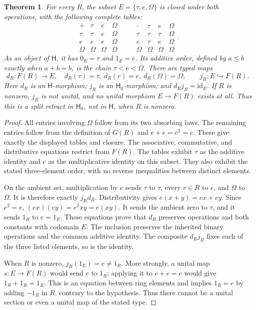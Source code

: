 \documentclass[11pt]{article}
\newtheorem{theorem}{Theorem}[section]
\theoremstyle{definition}
\newcommand{\HH}{\mathsf H}
\newcommand{\HHZ}{\mathsf H_0}
\newcommand{\Om}{\Omega}
\begin{document}
\begin{theorem}\label{thm:tripleretract}
For every \(R\), the subset \(E=\{\tau,e,\Om\}\) is closed under
both operations, with the following complete tables:
\[
\begin{array}{c|ccc}
 +&\tau&e&\Om\\\hline
 \tau&\tau&e&\Om\\
 e&e&e&\Om\\
 \Om&\Om&\Om&\Om
\end{array}
\qquad
\begin{array}{c|ccc}
 \cdot&\tau&e&\Om\\\hline
 \tau&\tau&\tau&\Om\\
 e&\tau&e&\Om\\
 \Om&\Om&\Om&\Om
\end{array}.
\tag{14}\label{eq:Etable}
\]
As an object of \(\HH\), it has \(0_E=\tau\) and \(1_E=e\).
Its additive order, defined by \(a\le b\) exactly when \(a+b=b\),
is the chain \(\tau<e<\Om\). There are typed maps
\[
 d_R:F(R)\longrightarrow E,\quad
 d_R(\tau)=\tau,\ d_R(r)=e,\ d_R(\Om)=\Om,
 \qquad j_R:E\hookrightarrow F(R).
\tag{15}\label{eq:dretract}
\]
Here \(d_R\) is an \(\HH\)-morphism; \(j_R\) is an
\(\HHZ\)-morphism; and \(d_Rj_R=\mathrm{id}_E\).
If \(R\) is nonzero, \(j_R\) is not unital, and no unital morphism
\(E\to F(R)\) exists at all. Thus this is a split retract in
\(\HHZ\), not in \(\HH\), when \(R\) is nonzero.
\end{theorem}
\begin{proof}
All entries involving \(\Om\) follow from its two absorbing laws.
The remaining entries follow from the definition of \(G(R)\) and
\(e+e=e^2=e\). These give exactly the displayed tables and closure.
The associative, commutative, and distributive equations restrict from
\(F(R)\). The tables exhibit \(\tau\) as the additive identity and
\(e\) as the multiplicative identity on this subset. They also exhibit
the stated three-element order, with no reverse inequalities between
distinct elements.

On the ambient set, multiplication by \(e\) sends \(\tau\) to
\(\tau\), every \(r\in R\) to \(e\), and \(\Om\) to \(\Om\).
It is therefore exactly \(j_Rd_R\). Distributivity gives
\(e(x+y)=ex+ey\). Since \(e^2=e\),
\((ex)(ey)=e^2xy=e(xy)\). It sends the ambient zero to \(\tau\),
and it sends \(1_R\) to \(e=1_E\). These equations prove that
\(d_R\) preserves operations and both constants with codomain \(E\).
The inclusion preserves the inherited binary operations and the common
additive identity. The composite \(d_Rj_R\) fixes each of the three
listed elements, so is the identity.

When \(R\) is nonzero, \(j_R(1_E)=e\ne1_R\). More strongly, a unital
map \(s:E\to F(R)\) would send \(e\) to \(1_R\); applying it to
\(e+e=e\) would give \(1_R+1_R=1_R\). This is an equation between
ring elements and implies \(1_R=e\) by adding \(-1_R\) in \(R\),
contrary to the hypothesis. Thus there cannot be a unital section or
even a unital map of the stated type.
\end{proof}
\end{document}
